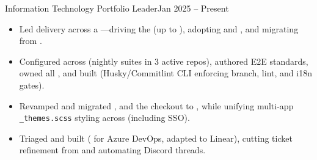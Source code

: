 


\begin{TimelineRole}{Information Technology Portfolio Leader}{Jan 2025 – Present}
    \begin{itemize}
        \item Led delivery across a —driving the  (up to ), adopting  and , and migrating from .
        \item Configured  across  (nightly suites in 3 active repos), authored E2E standards, owned all , and built \texttt{} (Husky/Commitlint CLI enforcing branch, lint, and i18n gates).
        \item Revamped and migrated , and the checkout  to , while unifying multi-app \texttt{\_themes.scss} styling across  (including SSO).
        \item Triaged  and built \texttt{} ( for Azure DevOps, adapted to Linear), cutting ticket refinement from  and automating Discord threads.
    \end{itemize}
\end{TimelineRole}


